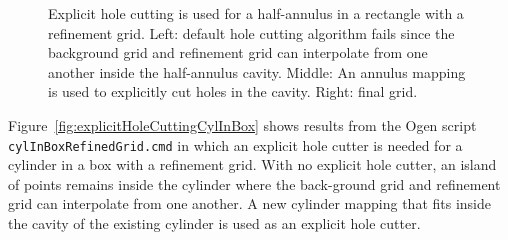 \documentclass[xcolor=rgb,svgnames,dvipsnames]{article}
\newcommand{\figures}{../fig}
\begin{document}
{
\newcommand{\figWidthd}{5.75cm}
\newcommand{\trimfig}[2]{\trimPlot{#1}{#2}{.10}{.10}{.15}{.30}}
\begin{figure}[hbt]
\begin{center}
\end{center}
  \caption{Explicit hole cutting is used for a half-annulus in a rectangle with a refinement grid. Left: default hole cutting algorithm
      fails since the background grid and refinement grid can interpolate from one another inside the half-annulus cavity. 
    Middle: An annulus mapping is used to explicitly cut holes in the cavity. Right: final grid.} 
 \label{fig:explicitHoleCuttingHalfAnnulus}
\end{figure}
}


Figure~\ref{fig:explicitHoleCuttingCylInBox} shows results from  the Ogen script {\tt cylInBoxRefinedGrid.cmd} in which
an explicit hole cutter is needed for a cylinder in a box with a refinement grid.
With no explicit hole cutter, an island of points remains inside the cylinder where the back-ground 
grid and refinement grid can interpolate from one another. A new cylinder mapping that fits inside the cavity of the 
existing cylinder is used as an explicit hole cutter. 
\end{document}
